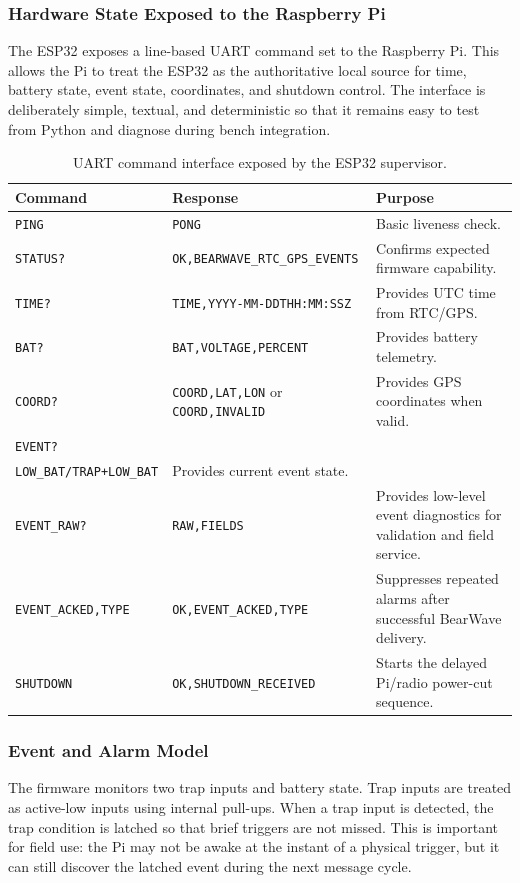 \documentclass[acmsmall,screen]{acmart}
\begin{document}
\subsubsection{Hardware State Exposed to the Raspberry Pi}
The ESP32 exposes a line-based UART command set to the Raspberry Pi. This allows the Pi to treat the ESP32 as the authoritative local source for time, battery state, event state, coordinates, and shutdown control. The interface is deliberately simple, textual, and deterministic so that it remains easy to test from Python and diagnose during bench integration.

\begin{table}[tbp]
\centering
\caption{UART command interface exposed by the ESP32 supervisor.}
\label{tab:esp32-uart-commands}
\footnotesize
\begin{tabularx}{\textwidth}{p{}p{}X}
\toprule
Command & Response & Purpose \\
\midrule
\texttt{PING} & \texttt{PONG} & Basic liveness check. \\
\texttt{STATUS?} & \texttt{OK,BEARWAVE\_RTC\_GPS\_EVENTS} & Confirms expected firmware capability. \\
\texttt{TIME?} & \texttt{TIME,YYYY-MM-DDTHH:MM:SSZ} & Provides UTC time from RTC/GPS. \\
\texttt{BAT?} & \texttt{BAT,VOLTAGE,PERCENT} & Provides battery telemetry. \\
\texttt{COORD?} & \texttt{COORD,LAT,LON} or \texttt{COORD,INVALID} & Provides GPS coordinates when valid. \\
\texttt{EVENT?} & \begin{tabular}[t]{@{}l@{}}\texttt{EVENT,NONE/TRAP/}\\\texttt{LOW\_BAT/TRAP+LOW\_BAT}\end{tabular} & Provides current event state. \\
\texttt{EVENT\_RAW?} & \texttt{RAW,FIELDS} & Provides low-level event diagnostics for validation and field service. \\
\texttt{EVENT\_ACKED,TYPE} & \texttt{OK,EVENT\_ACKED,TYPE} & Suppresses repeated alarms after successful BearWave delivery. \\
\texttt{SHUTDOWN} & \texttt{OK,SHUTDOWN\_RECEIVED} & Starts the delayed Pi/radio power-cut sequence. \\
\bottomrule
\end{tabularx}
\end{table}

\subsubsection{Event and Alarm Model}
The firmware monitors two trap inputs and battery state. Trap inputs are treated as active-low inputs using internal pull-ups. When a trap input is detected, the trap condition is latched so that brief triggers are not missed. This is important for field use: the Pi may not be awake at the instant of a physical trigger, but it can still discover the latched event during the next message cycle.
\end{document}
